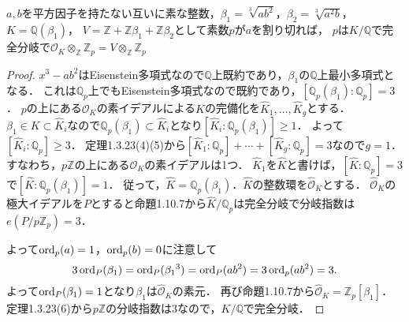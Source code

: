 \begin{screen}
  $a, b$を平方因子を持たない互いに素な整数，$\beta_1=\sqrt[3]{ab^2}$，$\beta_2=\sqrt[3]{a^2b}$，$K=\mathbb{Q}(\beta_1)$，
  $V=\mathbb{Z}+\mathbb{Z}\beta_1+\mathbb{Z}\beta_2$として素数$p$が$a$を割り切れば，
  $p$は$K/\mathbb{Q}$で完全分岐で$\mathcal{O}_K\otimes_\mathbb{Z}\mathbb{Z}_p = V\otimes_\mathbb{Z}\mathbb{Z}_p$
\end{screen}
\begin{proof}
  $x^3-ab^2$はEisenstein多項式なので$\mathbb{Q}$上既約であり，$\beta_1$の$\mathbb{Q}$上最小多項式となる．
  これは$\mathbb{Q}_p$上でもEisenstein多項式なので既約であり，$[\mathbb{Q}_p(\beta_1):\mathbb{Q}_p]=3$．
  $p$の上にある$\mathcal{O}_K$の素イデアルによる$K$の完備化を$\widehat{K}_1, \ldots, \widehat{K}_g$とする．
  $\beta_1 \in K \subset \widehat{K}_i$なので$\mathbb{Q}_p(\beta_1) \subset \widehat{K}_i$となり$[\widehat{K}_i:\mathbb{Q}_p(\beta_1)]\geq1$．
  よって$[\widehat{K}_i:\mathbb{Q}_p]\geq3$．
  定理1.3.23(4)(5)から$[\widehat{K}_1:\mathbb{Q}_p] + \cdots + [\widehat{K}_g:\mathbb{Q}_p] = 3$なので$g=1$．
  すなわち，$p\mathbb{Z}$の上にある$\mathcal{O}_K$の素イデアルは1つ．
  $\widehat{K}_1$を$\widehat{K}$と書けば，$[\widehat{K}:\mathbb{Q}_p]=3$で$[\widehat{K}:\mathbb{Q}_p(\beta_1)]=1$．
  従って，$\widehat{K} = \mathbb{Q}_p(\beta_1)$．$\widehat{K}$の整数環を$\widehat{\mathcal{O}}_K$とする．
  $\widehat{\mathcal{O}}_K$の極大イデアルを$P$とすると命題1.10.7から$\widehat{K}/\mathbb{Q}_p$は完全分岐で分岐指数は$e(P/p\mathbb{Z}_p)=3$．

  よって$\operatorname{ord}_p(a)=1$，$\operatorname{ord}_p(b)=0$に注意して
  \[3\operatorname{ord}_P(\beta_1)=\operatorname{ord}_P(\beta_1{}^3)=\operatorname{ord}_P(ab^2)=3\operatorname{ord}_p(ab^2)=3.\]
  よって$\operatorname{ord}_P(\beta_1)=1$となり$\beta_1$は$\widehat{\mathcal{O}}_K$の素元．
  再び命題1.10.7から$\widehat{\mathcal{O}}_K=\mathbb{Z}_p[\beta_1]$．
  定理1.3.23(6)から$p\mathbb{Z}$の分岐指数は$3$なので，$K/\mathbb{Q}$で完全分岐．


\end{proof}
